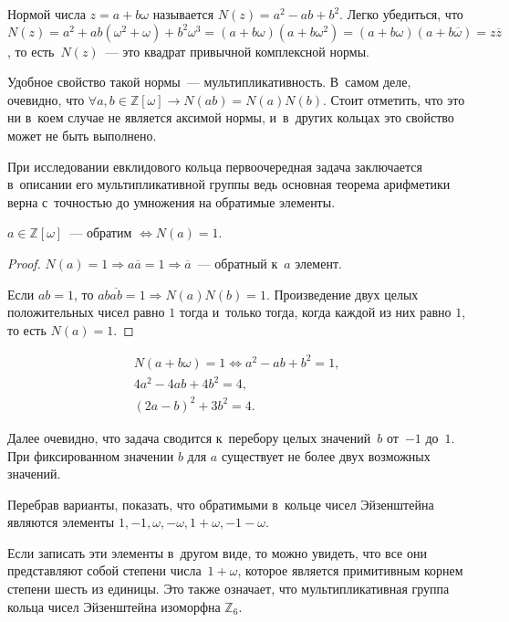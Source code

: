 \documentclass{article}
\begin{document}
\begin{definition}
  Нормой числа $z = a + b \omega$ называется $N(z) = a^2 - ab + b^2$. Легко
  убедиться, что $N(z) = a^2 + ab(\omega^2 + \omega) + b^2 \omega^3 =
  (a + b \omega)(a + b \omega^2) = (a + b \omega) (a + b \overline{\omega}) =
  z \overline{z}$, то есть~$N(z)$~--- это квадрат привычной комплексной нормы.
\end{definition}

Удобное свойство такой нормы~--- мультипликативность. В~самом деле, очевидно,
что $\forall a, b \in \mathbb{Z}[\omega] \rightarrow N(ab) = N(a) N(b)$. Стоит
отметить, что это ни в~коем случае не является аксимой нормы, и~в~других кольцах
это свойство может не быть выполнено.

При исследовании евклидового кольца первоочередная задача заключается в~описании
его мультипликативной группы ведь основная теорема арифметики верна с~точностью
до умножения на обратимые элементы.

\begin{claim}
    $a \in \mathbb{Z}[\omega]$~--- обратим $\Leftrightarrow N(a) = 1$.
\end{claim}
\begin{proof}
  $N(a) = 1 \Rightarrow a \overline{a} = 1 \Rightarrow \overline{a}$~---
  обратный к~$a$ элемент.

  Если $ab = 1$, то $ab \overline{ab} = 1 \Rightarrow N(a)N(b) = 1$.
  Произведение двух целых положительных чисел равно $1$ тогда и~только тогда,
  когда каждой из них равно $1$, то есть $N(a) = 1$.
\end{proof}

\begin{gather*}
  N(a + b \omega) = 1 \Leftrightarrow a^2 - ab + b^2 = 1,\\
  4 a^2 - 4ab + 4b^2 = 4,\\
  (2a - b)^2 + 3b^2 = 4.
\end{gather*}

Далее очевидно, что задача сводится к~перебору целых значений~$b$ от~$-1$
до~$1$. При фиксированном значении $b$ для $a$ существует не более двух
возможных значений.

\begin{exercise}
  Перебрав варианты, показать, что обратимыми в~кольце чисел Эйзенштейна
  являются элементы $1, -1, \omega, -\omega, 1 + \omega, -1 - \omega$.
\end{exercise}

Если записать эти элементы в~другом виде, то можно увидеть, что все они
представляют собой степени числа~$1 + \omega$, которое является примитивным
корнем степени шесть из единицы. Это также означает, что мультипликативная
группа кольца чисел Эйзенштейна изоморфна $\mathbb{Z}_6$.
\end{document}
